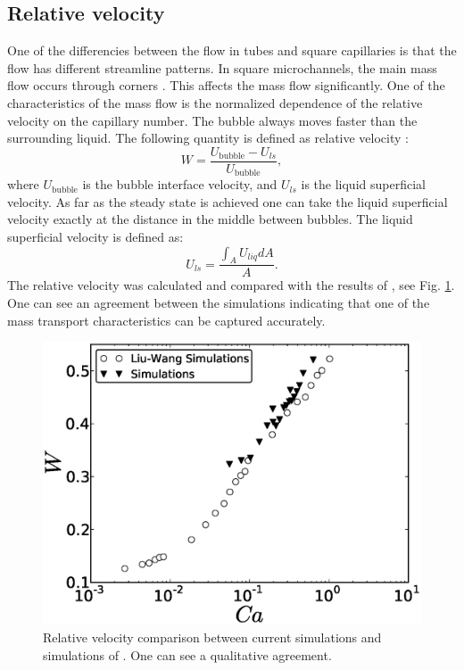 \documentclass[preprint,12pt]{elsarticle}
\begin{document}
\subsection{Relative velocity}
One of the differencies between the flow in tubes and square capillaries is that the flow has
different streamline patterns. In square microchannels, the main mass flow occurs through corners
\cite{heil-threedim,wang-non-circular}. This affects the mass flow significantly. One of the
characteristics of the mass flow is the normalized dependence of the relative velocity on the
capillary
number. The bubble always moves faster than the surrounding liquid. The following quantity is
defined as
relative velocity \cite{cerro-bubble-train}:
\begin{equation}
W=\frac{U_{\mathrm{bubble}}-U_{ls}}{U_{\mathrm{bubble}}},
\end{equation}
where $U_{\mathrm{bubble}}$ is the bubble interface velocity, and $U_{ls}$ is the liquid superficial
velocity. As far as the steady state is achieved one can take the liquid superficial velocity
exactly at the distance in the middle between bubbles. The liquid superficial velocity is
defined as:
\begin{equation}
U_{ls}=\frac{\int_{A}{U_{liq}dA}}{A}.
\end{equation}
The relative velocity was calculated and compared with the results of \citet{wang-non-circular},
see Fig. \ref{fig:relative:velocity}. One can see an agreement between the simulations indicating
that
one of the mass transport characteristics can be captured accurately. 
\begin{figure}[ht]
\includegraphics[width=\textwidth]{Figures/relative_velocity.eps}
\caption{Relative velocity comparison between current simulations and simulations of
\citet{wang-non-circular}. One can see a qualitative agreement. \label{fig:relative:velocity}}
\end{figure}
\end{document}
